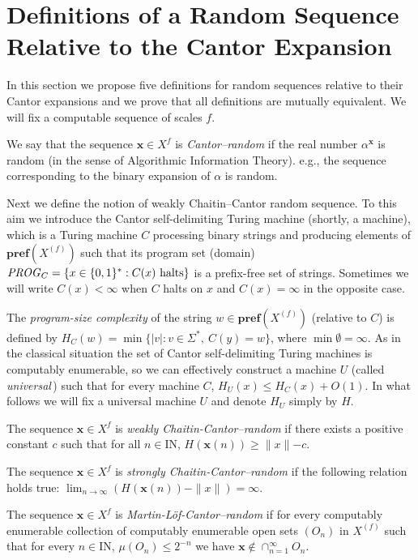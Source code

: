 \documentclass[11pt,a4paper,twoside]{article}
\def \pref#1{{\mathbf{pref}({#1})}}
\newcommand{\x}{{\mathbf x}}
\def \bbbn {\mathrm{I\!N}} %
\def \XF  {X^{(f)}}
\begin{document}
\section{Definitions of a Random Sequence Relative to the Cantor Expansion}


In this section we propose five definitions for random sequences relative to
their
Cantor expansions and we prove that all definitions are mutually equivalent.
We will fix a computable sequence of scales $f$.

We say that the sequence $\x \in X^{f}$ is {\it Cantor--random} if the real
number
$\alpha^{\x}$ is random (in the sense of Algorithmic Information Theory).
e.g., the sequence corresponding to the binary expansion of $\alpha$ is
random.


Next we define the notion of weakly Chaitin--Cantor random sequence. To this
aim we introduce the Cantor self-delimiting Turing machine (shortly, a
machine), which is a
 Turing machine $C$ processing binary strings and producing
elements of $\pref{\XF}$ such that its
program set (domain)
${\it PROG}_C=\{x\in\{0,1\}^* : C(x) \mbox{  halts}\}$
is   a prefix-free set of strings. Sometimes
we will write $C(x) < \infty$ when $C$ halts on $x$ and $C(x) = \infty$ in
the
opposite case.

The {\em program-size complexity} of the string
$w\in\pref{\XF}$ (relative to $C$)
is  defined by $H_C(w)=\min \{|v| :  v \in \Sigma^*, \ C(y)=w\}$,
where $\min \emptyset = \infty$. As in the classical situation
the set of Cantor self-delimiting Turing machines is computably enumerable,
so we can effectively construct  a  machine $U$ (called  {\em universal}\,)
such
that  for every  machine
$C$, $H_U (x) \leq H_C (x) + O(1)$.
In what follows we will fix a universal machine $U$ and denote $H_U$ simply
by $H$.



The sequence $\x \in X^{f}$ is {\it weakly Chaitin-Cantor--random} if there
exists
a positive constant $c$ such that for all $n\in \bbbn$,  $H(\x(n)) \ge
\parallel x \parallel -c$.


The sequence $\x \in X^{f}$ is {\it strongly Chaitin-Cantor--random} if the
following relation holds true:  $\lim_{n
\to \infty} (H(\x(n)) - \parallel x \parallel) = \infty$.



The sequence $\x \in X^{f}$ is {\it Martin-L\" of-Cantor--random} if   for
every computably enumerable collection of computably enumerable open sets
$(O_n)$ in $\XF$ such that for every $n\in \bbbn$,  $\mu (O_n)
\le 2^{-n}$ we have $\x \not\in \cap_{n=1}^{\infty} O_n$.
\end{document}
